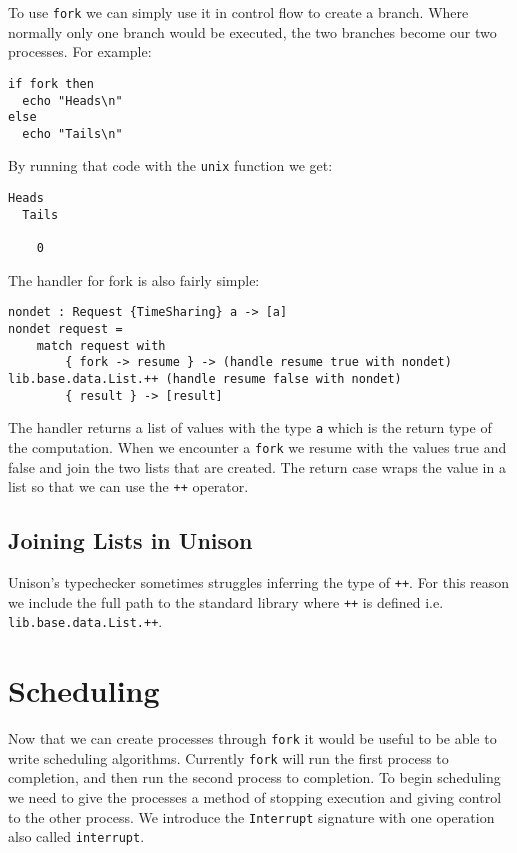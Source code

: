 \documentclass[logo,bsc,singlespacing,parskip]{infthesis}
\begin{document}
To use \texttt{fork} we can simply use it in control flow to create a branch.
Where normally only one branch would be executed, the two branches become our
two processes. For example:

\begin{lstlisting}[language=unison]
if fork then 
  echo "Heads\n"
else 
  echo "Tails\n"
\end{lstlisting}

By running that code with the \texttt{unix} function we get:

\begin{lstlisting}[style=terminal]
  Heads
  Tails
    
    0
\end{lstlisting}

The handler for fork is also fairly simple:

\begin{lstlisting}[language=unison]
nondet : Request {TimeSharing} a -> [a]
nondet request =
    match request with
        { fork -> resume } -> (handle resume true with nondet) lib.base.data.List.++ (handle resume false with nondet)
        { result } -> [result]
\end{lstlisting}

The handler returns a list of values with the type \texttt{a} which is the
return type of the computation. When we encounter a \texttt{fork} we resume
with the values true and false and join the two lists that are created. The
return case wraps the value in a list so that we can use the \texttt{++}
operator.

\subsection{Joining Lists in Unison}

Unison's typechecker sometimes struggles inferring the type of \texttt{++}. For
this reason we include the full path to the standard library where \texttt{++}
is defined i.e. \texttt{lib.base.data.List.++}.

\section{Scheduling}

Now that we can create processes through \texttt{fork} it would be useful to be able to write scheduling algorithms. Currently \texttt{fork} will run the first process to completion, and then run the second process to completion. To begin scheduling we need to give the processes a method of stopping execution and giving control to the other process. We introduce the \texttt{Interrupt} signature with one operation also called \texttt{interrupt}.
\end{document}
